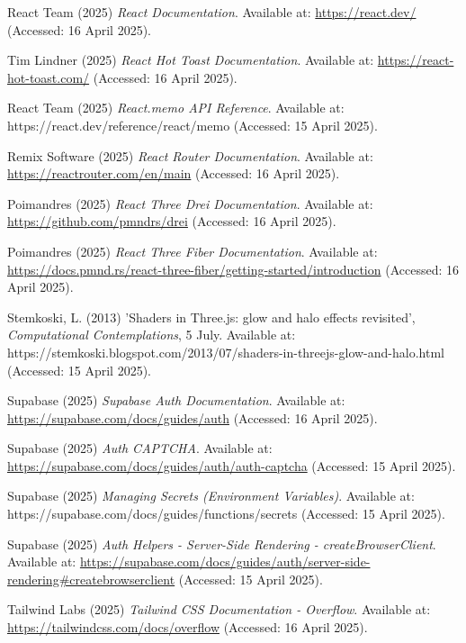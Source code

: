\documentclass[11pt]{article} %
\begin{document}
\begin{thebibliography}{99}
React Team (2025) \textit{React Documentation}. Available at: \url{https://react.dev/} (Accessed: 16 April 2025).

Tim Lindner (2025) \textit{React Hot Toast Documentation}. Available at: \url{https://react-hot-toast.com/} (Accessed: 16 April 2025).

React Team (2025) \textit{React.memo API Reference}. Available at: https://react.dev/reference/react/memo (Accessed: 15 April 2025).

Remix Software (2025) \textit{React Router Documentation}. Available at: \url{https://reactrouter.com/en/main} (Accessed: 16 April 2025).

Poimandres (2025) \textit{React Three Drei Documentation}. Available at: \url{https://github.com/pmndrs/drei} (Accessed: 16 April 2025).

Poimandres (2025) \textit{React Three Fiber Documentation}. Available at: \url{https://docs.pmnd.rs/react-three-fiber/getting-started/introduction} (Accessed: 16 April 2025).

Stemkoski, L. (2013) 'Shaders in Three.js: glow and halo effects revisited', \textit{Computational Contemplations}, 5 July. Available at: https://stemkoski.blogspot.com/2013/07/shaders-in-threejs-glow-and-halo.html (Accessed: 15 April 2025).

Supabase (2025) \textit{Supabase Auth Documentation}. Available at: \url{https://supabase.com/docs/guides/auth} (Accessed: 16 April 2025).

Supabase (2025) \textit{Auth CAPTCHA}. Available at: \url{https://supabase.com/docs/guides/auth/auth-captcha} (Accessed: 15 April 2025).

Supabase (2025) \textit{Managing Secrets (Environment Variables)}. Available at: https://supabase.com/docs/guides/functions/secrets (Accessed: 15 April 2025).

Supabase (2025) \textit{Auth Helpers - Server-Side Rendering - createBrowserClient}. Available at: \url{https://supabase.com/docs/guides/auth/server-side-rendering#createbrowserclient} (Accessed: 15 April 2025).

Tailwind Labs (2025) \textit{Tailwind CSS Documentation - Overflow}. Available at: \url{https://tailwindcss.com/docs/overflow} (Accessed: 16 April 2025).


\end{thebibliography}
\end{document}

